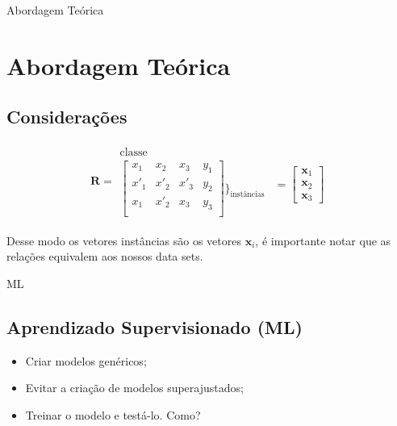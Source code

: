 \documentclass[compress]{beamer}
\begin{document}
\begin{frame}{Abordagem Teórica}
    \section{Abordagem Teórica}
    \subsection*{Considerações}
    \begin{align*}
        \mathbf{R}=\begin{array}{cc}
             \text{classe} \\
             \left[\begin{array}{ccc|c}
                  x_1& x_2&x_3& y_1\\
                  x'_1& x'_2&x'_3&y_2\\
                  x_1& x'_2&x_3&y_3\\
             \end{array}\right]\Bigg\}_{\text{instâncias}}
        \end{array}\begin{array}{c}\\=\begin{bmatrix}\mathbf{x}_1\\\mathbf{x}_2\\\mathbf{x}_3\end{bmatrix}\end{array}
    \end{align*}
    
    Desse modo os vetores instâncias são os vetores $\mathbf{x}_i$, é importante notar que as relações equivalem aos nossos data sets.
\end{frame}
\begin{frame}{ML}
    \subsection{Aprendizado Supervisionado (ML)}
    \begin{itemize}
        \item Criar modelos genéricos;
        \item Evitar a criação de modelos superajustados;
        \item Treinar o modelo e testá-lo. Como?
    \end{itemize}
\end{frame}

\end{document}
